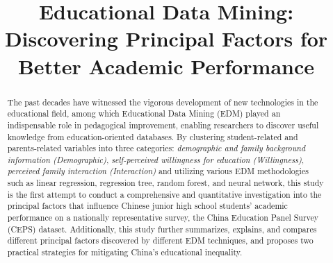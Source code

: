 \documentclass[conference]{IEEEtran}
\begin{document}
\title{Educational Data Mining: Discovering Principal Factors for Better Academic Performance \\
}
\author{
\and
{}
\and
{}
\and
{}
}
\maketitle
\begin{abstract}
The past decades have witnessed the vigorous development of new technologies in the educational field, among which Educational Data Mining (EDM) played an indispensable role in pedagogical improvement, enabling researchers to discover useful knowledge from education-oriented databases. By clustering student-related and parents-related variables into three categories: \textit{demographic and family background information (Demographic)}, \textit{self-perceived willingness for education (Willingness)}, \textit{perceived family interaction (Interaction)} and utilizing various EDM methodologies such as linear regression, regression tree, random forest, and neural network, this study is the first attempt to conduct a comprehensive and quantitative investigation into the principal factors that influence Chinese junior high school students’ academic performance on a nationally representative survey, the China Education Panel Survey (CEPS) dataset. Additionally, this study further summarizes, explains, and compares different principal factors discovered by different EDM techniques, and proposes two practical strategies for mitigating China's educational inequality.\\
\end{abstract}
\end{document}
